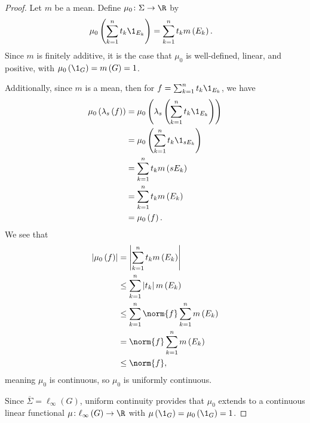 \begin{proof}
  Let $m$ be a mean. Define $\mu_0\colon \Sigma\rightarrow \R$ by
  \begin{align*}
    \mu_0\left(\sum_{k=1}^{n}t_k\1_{E_k}\right) &= \sum_{k=1}^{n}t_km\left(E_k\right).
  \end{align*}
  Since $m$ is finitely additive, it is the case that $\mu_0$ is well-defined, linear, and positive, with $\mu_0\left(\1_{G}\right) = m\left(G\right) = 1$.\newline

  Additionally, since $m$ is a mean, then for $f = \sum_{k=1}^{n}t_k\1_{E_k}$, we have
  \begin{align*}
    \mu_0\left(\lambda_s\left(f\right)\right) &= \mu_0\left(\lambda_s\left(\sum_{k=1}^{n}t_k\1_{E_k}\right)\right)\\
                                              &= \mu_0\left(\sum_{k=1}^{n}t_k\1_{sE_k}\right)\\
                                              &= \sum_{k=1}^{n}t_km\left(sE_k\right)\\
                                              &= \sum_{k=1}^{n}t_km\left(E_k\right)\\
                                              &= \mu_0\left(f\right).
  \end{align*}
  We see that
  \begin{align*}
    \left\vert \mu_0\left(f\right) \right\vert &= \left\vert \sum_{k=1}^{n}t_km\left(E_k\right) \right\vert\\
                                               &\leq \sum_{k=1}^{n}\left\vert t_k \right\vert m\left(E_k\right)\\
                                               &\leq \sum_{k=1}^{n}\norm{f}\sum_{k=1}^{n}m\left(E_k\right)\\
                                               &= \norm{f}\sum_{k=1}^{n}m\left(E_k\right)\\
                                               &\leq \norm{f},
  \end{align*}
  meaning $\mu_0$ is continuous, so $\mu_0$ is uniformly continuous.\newline

  Since $\overline{\Sigma} = \ell_{\infty}\left(G\right)$, uniform continuity provides that $\mu_0$ extends to a continuous linear functional $\mu\colon \ell_{\infty}\left(G\right)\rightarrow \R$ with $\mu\left(\1_{G}\right) = \mu_0\left(\1_{G}\right) = 1$.\newline


\end{proof}
